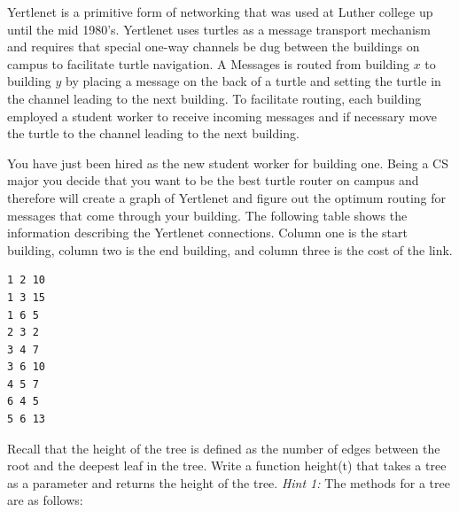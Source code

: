 \documentclass[11pt]{exam}
\begin{document}
\begin{questions}
\newpage
\question
Yertlenet is a primitive form of networking that was used at Luther college up until the mid 1980's.  Yertlenet uses turtles as a message transport mechanism and requires that special one-way channels be dug between the buildings on campus to facilitate turtle navigation. A Messages is routed from building $x$ to building $y$ by placing a message on the back of a turtle and setting the turtle in the channel leading to the next building.  To facilitate routing, each building employed a student worker to receive incoming messages and if necessary move the turtle to the channel leading to the next building.  

You have just been hired as the new student worker for building one. Being a CS major you decide that you want to be the best turtle router on campus and therefore will create a graph of Yertlenet and figure out the optimum routing for messages that come through your building. The following table shows the information describing the Yertlenet connections. Column one is the start building, column two is the end building, and column three is the cost of the link.

\begin{verbatim}
1 2 10
1 3 15
1 6 5
2 3 2
3 4 7
3 6 10
4 5 7
6 4 5
5 6 13
\end{verbatim}


\newpage
\question[10]  Recall that the height of the tree is defined as the number of edges between the root and the deepest leaf in the tree.  Write a function height(t) that takes a tree as a parameter and returns the height of the tree.  \textit{Hint 1:} The methods for a tree are as follows:
\begin{itemize}


\end{itemize}
\end{questions}
\end{document}
